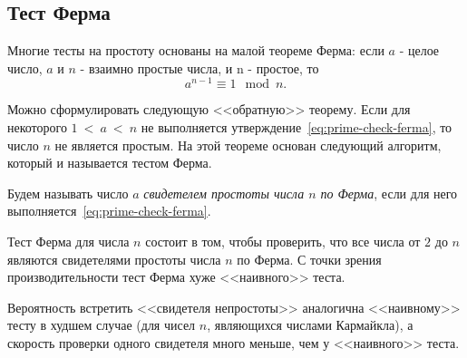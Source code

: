 \subsection{Тест Ферма}\label{section-prime-check-ferma}

Многие тесты на простоту основаны на малой теореме Ферма: если $a$ - целое число, $a$ и $n$ - взаимно простые числа, и n - простое, то
\begin{equation}\label{eq:prime-check-ferma}
    a^{n-1} \equiv 1 \mod n.
\end{equation}

Можно сформулировать следующую <<обратную>> теорему. Если для некоторого $1~<~a~<~n$ не выполняется утверждение~\ref{eq:prime-check-ferma}, то число $n$ не является простым. На этой теореме основан следующий алгоритм, который и называется тестом Ферма.

Будем называть число $a$ \emph{свидетелем простоты числа $n$ по Ферма}, если для него выполняется~\ref{eq:prime-check-ferma}.

Тест Ферма для числа $n$ состоит в том, чтобы проверить, что все числа от $2$ до $n$ являются свидетелями простоты числа $n$ по Ферма. С точки зрения производительности тест Ферма хуже <<наивного>> теста.

Вероятность встретить <<свидетеля непростоты>> аналогична <<наивному>> тесту в худшем случае (для чисел $n$, являющихся числами Кармайкла), а скорость проверки одного свидетеля много меньше, чем у <<наивного>> теста.
